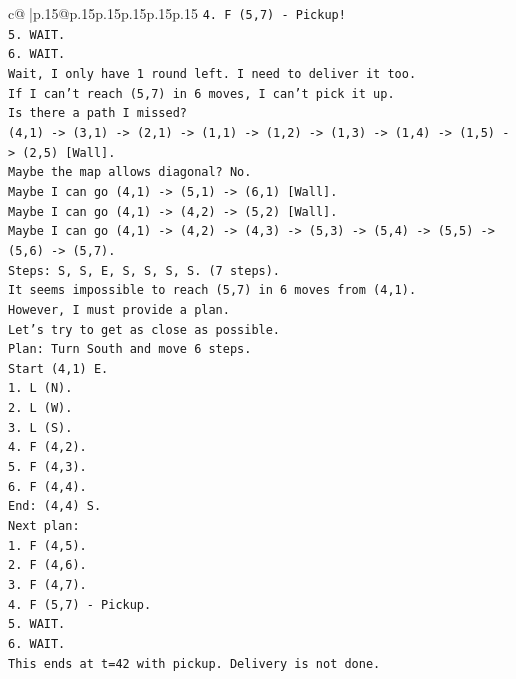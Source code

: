 \documentclass{article}
\begin{document}
{\begin{supertabular}{c@{$\;$}|p{.15\linewidth}@{}p{.15\linewidth}p{.15\linewidth}p{.15\linewidth}p{.15\linewidth}p{.15\linewidth}}
{{{\texttt{4. F (5,7) {-} Pickup!} \\
\texttt{5. WAIT.} \\
\texttt{6. WAIT.} \\
\texttt{Wait, I only have 1 round left. I need to deliver it too.} \\
\texttt{If I can't reach (5,7) in 6 moves, I can't pick it up.} \\
\texttt{Is there a path I missed?} \\
\texttt{(4,1) {-}> (3,1) {-}> (2,1) {-}> (1,1) {-}> (1,2) {-}> (1,3) {-}> (1,4) {-}> (1,5) {-}> (2,5) {[}Wall{]}.} \\
\texttt{Maybe the map allows diagonal? No.} \\
\texttt{Maybe I can go (4,1) {-}> (5,1) {-}> (6,1) {[}Wall{]}.} \\
\texttt{Maybe I can go (4,1) {-}> (4,2) {-}> (5,2) {[}Wall{]}.} \\
\texttt{Maybe I can go (4,1) {-}> (4,2) {-}> (4,3) {-}> (5,3) {-}> (5,4) {-}> (5,5) {-}> (5,6) {-}> (5,7).} \\
\texttt{Steps: S, S, E, S, S, S, S. (7 steps).} \\
\texttt{It seems impossible to reach (5,7) in 6 moves from (4,1).} \\
\texttt{However, I must provide a plan.} \\
\texttt{Let's try to get as close as possible.} \\
\texttt{Plan: Turn South and move 6 steps.} \\
\texttt{Start (4,1) E.} \\
\texttt{1. L (N).} \\
\texttt{2. L (W).} \\
\texttt{3. L (S).} \\
\texttt{4. F (4,2).} \\
\texttt{5. F (4,3).} \\
\texttt{6. F (4,4).} \\
\texttt{End: (4,4) S.} \\
\texttt{Next plan:} \\
\texttt{1. F (4,5).} \\
\texttt{2. F (4,6).} \\
\texttt{3. F (4,7).} \\
\texttt{4. F (5,7) {-} Pickup.} \\
\texttt{5. WAIT.} \\
\texttt{6. WAIT.} \\
\texttt{This ends at t=42 with pickup. Delivery is not done.} \\
}}}
\end{supertabular}}
\end{document}
